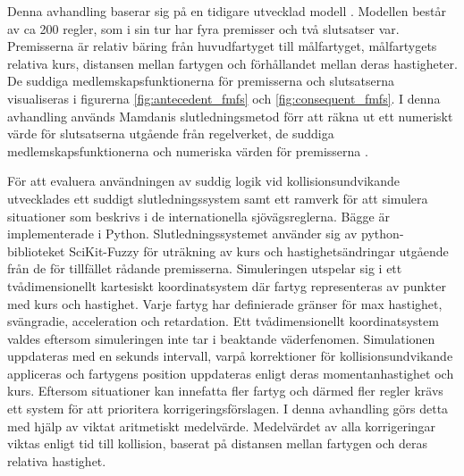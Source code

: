 Denna avhandling baserar sig på en tidigare utvecklad modell . Modellen består av ca 200 regler, som i sin tur har fyra premisser och två slutsatser var.  Premisserna är relativ bäring från huvudfartyget till målfartyget, målfartygets relativa kurs, distansen mellan fartygen och förhållandet mellan deras hastigheter. De suddiga medlemskapsfunktionerna för premisserna och slutsatserna visualiseras i figurerna \ref{fig:antecedent_fmfs} och \ref{fig:consequent_fmfs}.  I denna avhandling används Mamdanis  slutledningsmetod förr att räkna ut ett numeriskt värde för slutsatserna utgående från regelverket, de suddiga medlemskapsfunktionerna och numeriska värden för premisserna \cite{perera2010smooth_param,perera2012intelligent}.


För att evaluera användningen av suddig logik vid kollisionsundvikande utvecklades ett suddigt slutledningssystem samt ett ramverk för att simulera situationer som beskrivs i de  internationella sjövägsreglerna. Bägge är implementerade i Python. Slutledningssystemet använder sig av python-biblioteket SciKit-Fuzzy \cite{josh_warner_2017_1002946} för uträkning av kurs och hastighetsändringar utgående från  de för tillfället rådande premisserna. Simuleringen utspelar sig i ett tvådimensionellt kartesiskt koordinatsystem där fartyg representeras av punkter med  kurs och hastighet. Varje fartyg har definierade gränser för max hastighet, svängradie, acceleration och retardation.  Ett tvådimensionellt koordinatsystem valdes eftersom simuleringen inte tar i beaktande väderfenomen. Simulationen uppdateras med en sekunds intervall, varpå  korrektioner för kollisionsundvikande appliceras och fartygens position uppdateras enligt deras momentanhastighet och kurs.   Eftersom situationer kan innefatta fler fartyg och därmed fler regler krävs ett system för att prioritera korrigeringsförslagen. I denna avhandling görs detta med hjälp av viktat aritmetiskt medelvärde. Medelvärdet av alla korrigeringar viktas enligt tid till kollision, baserat på  distansen mellan fartygen och deras relativa hastighet.



